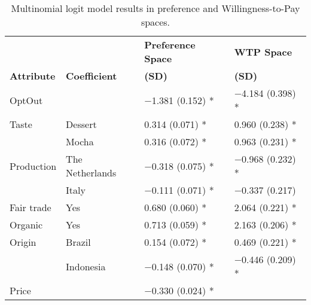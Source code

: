 \documentclass[sustainability,article,accept,moreauthors,pdftex,10pt,a4paper]{Definitions/mdpi}
\theoremstyle{mdpi}
\newcounter{ex}
\newcounter{re}
\theoremstyle{mdpidefinition}
\begin{document}
{{\begin{table}[H]
\centering
\caption{Multinomial logit model %
results in preference and Willingness-to-Pay %
spaces.}
\vspace{-6pt}
\label{tablewtpmnl}
\begin{tabular}{p{2cm}p{3.5cm} p{3cm} p{3cm}}\\ \toprule
&                 & \multicolumn{1}{l}{\textbf{Preference Space}}         &\multicolumn{1}{l}{\textbf{WTP Space}} \\
\textbf{Attribute}         & \textbf{Coefficient}     & \boldmath{$\beta$}\textbf{ (SD)}                                 & \boldmath{$\omega$}\textbf{ (SD)}  \\ \midrule
OptOut              &                 & $-$1.381 (0.152) *                               & $-$4.184 (0.398) *    \\
Taste            & Dessert         & 0.314 (0.071) *                                & 0.960 (0.238) *    \\
& Mocha           & 0.316 (0.072) *                                & 0.963 (0.231) *    \\
Production        & The Netherlands     & $-$0.318 (0.075) *                               & $-$0.968 (0.232) *     \\
& Italy           & $-$0.111 (0.071) *                               & $-$0.337 (0.217)     \\
Fair trade        & Yes             & 0.680 (0.060) *                                & 2.064 (0.221) *      \\
Organic           & Yes             & 0.713 (0.059) *                                & 2.163 (0.206) *      \\
Origin            & Brazil          & 0.154 (0.072) *                                & 0.469 (0.221) *    \\
& Indonesia       & $-$0.148 (0.070) *                               & $-$0.446 (0.209) *    \\
Price             &                 & $-$0.330 (0.024) *                               &                   \\
\midrule

\end{tabular}
\end{table}}}
\end{document}
